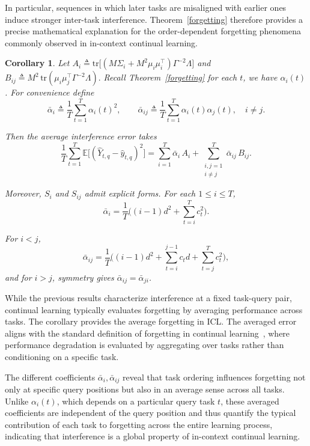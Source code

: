 \documentclass{article}
\theoremstyle{plain}
\newtheorem{corollary}[theorem]{Corollary}
\theoremstyle{definition}
\theoremstyle{remark}
\begin{document}
In particular, sequences in which later tasks are misaligned with earlier ones induce stronger inter-task interference. Theorem~\ref{forgetting} therefore provides a precise mathematical explanation for the order-dependent forgetting phenomena commonly observed in in-context continual learning.

\begin{corollary}
\label{aver}
Let $A_i \triangleq \mathrm{tr}\!\big[(M\Sigma_i+M^2\mu_i\mu_i^\top)\Gamma^{-2}\Lambda\big]$ and $B_{ij} \triangleq M^2\,\mathrm{tr}(\mu_i\mu_j^\top\Gamma^{-2}\Lambda).$
Recall Theorem~\ref{forgetting} for each $t$, we have $\alpha_i(t)$.
For convenience define
\[
\bar{\alpha}_i \triangleq \frac{1}{T}\sum_{t=1}^T \alpha_i(t)^2,
\qquad
\bar{\alpha} _{ij}\triangleq \frac{1}{T}\sum_{t=1}^T \alpha_i(t)\alpha_j(t),\quad i\ne j.
\]

Then the average interference error takes
\[
\frac{1}{T}\sum_{t=1}^T 
\mathbb{E}\big[(\hat{Y}_{t,q}-\hat y_{t,q})^2\big]
=
\sum_{i=1}^T \bar{\alpha}_i\,A_i
+
\sum_{\substack{i,j=1\\i\ne j}}^T \bar{\alpha} _{ij}\,B_{ij}.
\]

Moreover, $S_i$ and $S_{ij}$ admit explicit forms.  
For each $1\le i\le T$,
\[
\bar{\alpha}_{i}=\frac{1}{T}\Big((i-1)d^2 + \sum_{t=i}^T c_t^2\Big).
\]

For $i<j$,
\[
\bar{\alpha}_{ij}
=\frac{1}{T}\Big((i-1)d^2 
+ \sum_{t=i}^{j-1} c_t d
+ \sum_{t=j}^T c_t^2\Big),
\]
and for $i>j$, symmetry gives $\bar{\alpha} _{ij} = \bar{\alpha} _{ji}$.
\end{corollary}

While the previous results characterize interference at a fixed task-query pair, continual learning typically evaluates forgetting by averaging performance across tasks. The corollary provides the average forgetting in ICL. The averaged error aligns with the standard definition of forgetting in continual learning~\cite{pmlr-v178-evron22a,pmlr-v202-lin23f}, where performance degradation is evaluated by aggregating over tasks rather than conditioning on a specific task.

The different coefficients $\bar{\alpha}_{i}, \bar{\alpha}_{ij}$ reveal that task ordering influences forgetting not only at specific query positions but also in an average sense across all tasks. Unlike $\alpha_i(t)$, which depends on a particular query task $t$, these averaged coefficients are independent of the query position and thus quantify the typical contribution of each task to forgetting across the entire learning process, indicating that interference is a global property of in-context continual learning.
\end{document}
